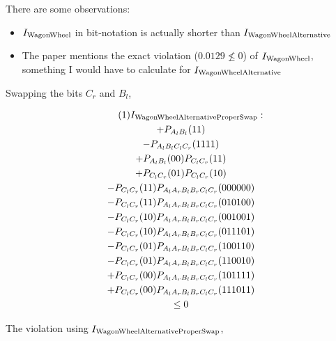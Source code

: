\documentclass[aps, 10pt, english, twoside, pra, nofootinbib, tightenlines, longbibliography, superscriptaddress]{revtex4-1}
\begin{document}
    There are some observations:
    \begin{itemize}
        \item $I_\text{WagonWheel}$ in bit-notation is actually shorter than $I_\text{WagonWheelAlternative}$
        \item The paper mentions the exact violation ($0.0129 \nleq 0$) of $I_\text{WagonWheel}$, something I would have to calculate for $I_\text{WagonWheelAlternative}$
    \end{itemize}

    Swapping the bits $C_{r}$ and $B_{l}$,


    \begin{equation*}
    \begin{gathered}
        \eq
        I\tsb{WagonWheelAlternativeProperSwap} : \\
        +P_{A_{l}B_{l}}(11) \\
        -P_{A_{l}B_{l}C_{l}C_{r}}(1111) \\
        +P_{A_{l}B_{l}}(00) P_{C_{l}C_{r}}(11) \\
        +P_{C_{l}C_{r}}(01) P_{C_{l}C_{r}}(10) \\
        -P_{C_{l}C_{r}}(11) P_{A_{l}A_{r}B_{l}B_{r}C_{l}C_{r}}(000000) \\
        -P_{C_{l}C_{r}}(11) P_{A_{l}A_{r}B_{l}B_{r}C_{l}C_{r}}(010100) \\
        -P_{C_{l}C_{r}}(10) P_{A_{l}A_{r}B_{l}B_{r}C_{l}C_{r}}(001001) \\
        -P_{C_{l}C_{r}}(10) P_{A_{l}A_{r}B_{l}B_{r}C_{l}C_{r}}(011101) \\
        -P_{C_{l}C_{r}}(01) P_{A_{l}A_{r}B_{l}B_{r}C_{l}C_{r}}(100110) \\
        -P_{C_{l}C_{r}}(01) P_{A_{l}A_{r}B_{l}B_{r}C_{l}C_{r}}(110010) \\
        +P_{C_{l}C_{r}}(00) P_{A_{l}A_{r}B_{l}B_{r}C_{l}C_{r}}(101111) \\
        +P_{C_{l}C_{r}}(00) P_{A_{l}A_{r}B_{l}B_{r}C_{l}C_{r}}(111011) \\
        \leq 0
    \end{gathered}
    \end{equation*}

    The violation using $I_\text{WagonWheelAlternativeProperSwap}$,
\end{document}
